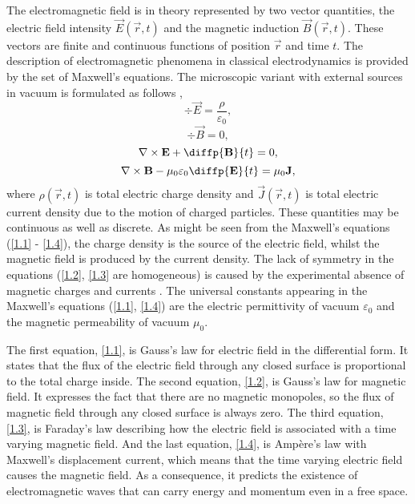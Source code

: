 The electromagnetic field is in theory \cite{Stratton2007, Jackson2005, Feynman1963, Thide2011} represented by two vector quantities, the electric field intensity $ \vec{E}\left( \vec{r}, t \right) $ and the magnetic induction $ \vec{B}\left( \vec{r}, t \right) $. These vectors are finite and continuous functions of position $ \vec{r} $ and time $ t $. The description of electromagnetic phenomena in classical electrodynamics is provided by the set of Maxwell's equations. The microscopic variant with external sources in vacuum is formulated as follows \cite{Stratton2007},
\begin{equation}
\label{1.1}
\div{\vec{E}} = \frac{\rho}{\varepsilon_0},
\end{equation}
\begin{equation}
\label{1.2}
\div{\vec{B}} = 0,
\end{equation}
\begin{equation}
\label{1.3}
\rot{\vec{E}} + \diffp{\vec{B}}{t} = 0,
\end{equation}
\begin{equation}
\label{1.4}
\rot{\vec{B}} - \mu_0 \varepsilon_0 \diffp{\vec{E}}{t}= \mu_0 \vec{J},
\end{equation}
where $ \rho\left( \vec{r}, t \right) $ is total electric charge density and $ \vec{J}\left( \vec{r}, t \right) $ is total electric current density due to the motion of charged particles. These quantities may be continuous as well as discrete. As might be seen from the Maxwell's equations (\ref{1.1} - \ref{1.4}), the charge density is the source of the electric field, whilst the magnetic field is produced by the current density. The lack of symmetry in the equations (\ref{1.2}, \ref{1.3} are homogeneous) is caused by the experimental absence of magnetic charges and currents \cite{Thide2011}. The universal constants appearing in the Maxwell's equations (\ref{1.1}, \ref{1.4}) are the electric permittivity of vacuum $ \varepsilon_0 $ and the magnetic permeability of vacuum $ \mu_0 $.

The first equation, \ref{1.1}, is Gauss's law for electric field in the differential form. It states that the flux of the electric field through any closed surface is proportional to the total charge inside. The second equation, \ref{1.2}, is Gauss's law for magnetic field. It expresses the fact that there are no magnetic monopoles, so the flux of magnetic field through any closed surface is always zero. The third equation, \ref{1.3}, is Faraday's law describing how the electric field is associated with a time varying magnetic field. And the last equation, \ref{1.4}, is Amp\`ere's law with Maxwell's displacement current, which means that the time varying electric field causes the magnetic field. As a consequence, it predicts the existence of electromagnetic waves that can carry energy and momentum even in a free space.

